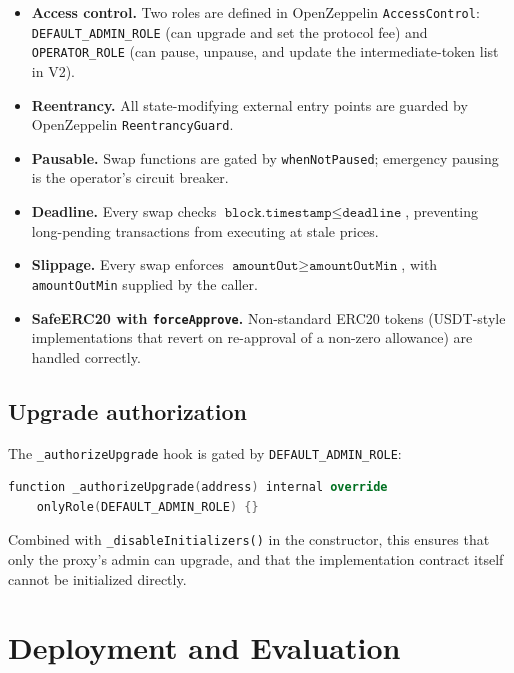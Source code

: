 \documentclass[11pt,a4paper]{article}
\theoremstyle{definition}
\begin{document}
\begin{itemize}[leftmargin=*]
    \item \textbf{Access control.} Two roles are defined in OpenZeppelin
          \texttt{AccessControl}: \texttt{DEFAULT\_ADMIN\_ROLE} (can upgrade and
          set the protocol fee) and \texttt{OPERATOR\_ROLE} (can pause, unpause,
          and update the intermediate-token list in V2).
    \item \textbf{Reentrancy.} All state-modifying external entry points are
          guarded by OpenZeppelin \texttt{ReentrancyGuard}.
    \item \textbf{Pausable.} Swap functions are gated by
          \texttt{whenNotPaused}; emergency pausing is the operator's circuit
          breaker.
    \item \textbf{Deadline.} Every swap checks $\texttt{block.timestamp} \leq
          \texttt{deadline}$, preventing long-pending transactions from executing
          at stale prices.
    \item \textbf{Slippage.} Every swap enforces
          $\texttt{amountOut} \geq \texttt{amountOutMin}$, with \texttt{amountOutMin}
          supplied by the caller.
    \item \textbf{SafeERC20 with \texttt{forceApprove}.} Non-standard ERC20
          tokens (USDT-style implementations that revert on re-approval of a
          non-zero allowance) are handled correctly.
\end{itemize}

\subsection{Upgrade authorization}

The \texttt{\_authorizeUpgrade} hook is gated by \texttt{DEFAULT\_ADMIN\_ROLE}:
\begin{lstlisting}[language=C++, basicstyle=\ttfamily\footnotesize]
function _authorizeUpgrade(address) internal override
    onlyRole(DEFAULT_ADMIN_ROLE) {}
\end{lstlisting}
Combined with \texttt{\_disableInitializers()} in the constructor, this ensures
that only the proxy's admin can upgrade, and that the implementation contract
itself cannot be initialized directly.

\section{Deployment and Evaluation}
\label{sec:deploy}
\end{document}
